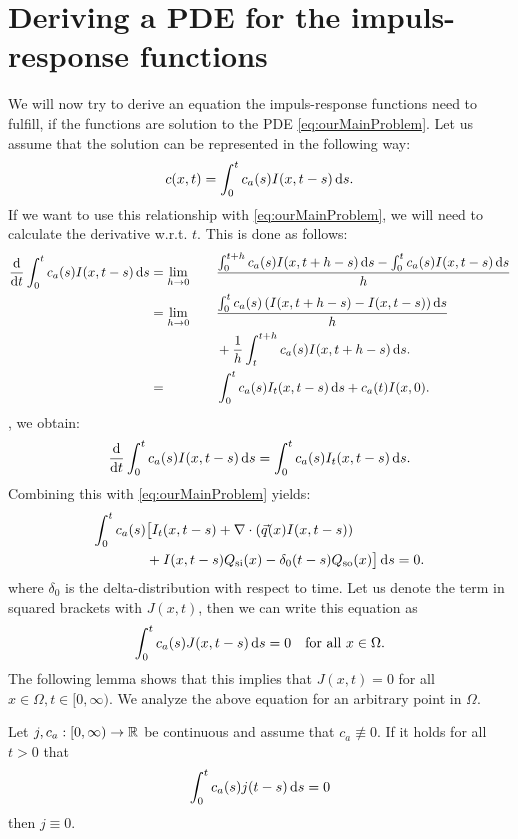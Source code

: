 \documentclass[paper=a4, fontsize=12pt,parskip=half,draft,headings=small]{scrartcl}
\newcommand{\Qso}{Q_{\mathrm{so}}}
\newcommand{\Qsi}{Q_{\mathrm{si}}}
\newcommand{\q}{\vec{q}}
\begin{document}
		\section{Deriving a PDE for the impuls-response functions}
		We will now try to derive an equation the impuls-response functions need to fulfill, if the functions are solution to the PDE \eqref{eq:ourMainProblem}.
		Let us assume that the solution can be represented in the following way:
		\[
			c(x,t) = \int_0^t c_a(s)I(x,t-s)\mathop{}\!\mathrm{d} s.
		\]
		If we want to use this relationship with \eqref{eq:ourMainProblem}, we will need to calculate the derivative w.r.t. $t$.
		This is done as follows:
		\begin{alignat*}{2}
			\frac{\diff}{\diff t} \int_0^t c_a(s)I(x,t-s)\diff s &= \lim_{h \to 0} \quad & &\frac{\int_0^{t+h} c_a(s)I(x,t+h-s)\diff s - \int_0^{t} c_a(s)I(x,t-s)\diff s}{h} \\
			&= \lim_{h \to 0} &&\frac{\int_0^{t} c_a(s)\left(I(x,t+h-s)-I(x,t-s) \right)\diff s}{h} \\
				&&&+ \frac{1}{h}\int_t^{t+h} c_a(s)I(x,t+h-s)\diff s. \\
				&= &&\int_0^t c_a(s) I_t(x,t-s) \diff s + c_a(t)I(x,0).
		\end{alignat*}
		, we obtain:
		\[
			\frac{\mathop{}\!\mathrm{d}}{\mathop{}\!\mathrm{d} t} \int_0^t c_a(s)I(x,t-s)\mathop{}\!\mathrm{d} s = \int_0^t c_a(s)I_t(x,t-s)\mathop{}\!\mathrm{d} s.
		\]
		Combining this with \eqref{eq:ourMainProblem} yields:
		\begin{align*}
			\int_0^t c_a(s) &\big[ I_t(x,t-s) + \nabla \cdot \left(\q(x)  I(x,t-s) \right) \\ 
			&+ I(x,t-s)\Qsi(x) -  \delta_0(t-s)\Qso(x) \big]  \diff s = 0.
		\end{align*}
		where $\delta_0$ is the delta-distribution with respect to time.
		Let us denote the term in squared brackets with $J(x,t)$, then we can write this equation as
		\[
			\int_0^t c_a(s) J(x,t-s) \mathop{}\!\mathrm{d} s = 0 \quad \text{for all }x \in \Omega.
		\]
		The following lemma shows that this implies that $J(x,t) = 0$ for all $x \in \Omega, t \in [0,\infty)$.
		We analyze the above equation for an arbitrary point in $\Omega$.
		\begin{lemma}
			Let $j,c_a:[0,\infty) \to \mathbb{R}$ be continuous and assume that $c_a \not\equiv 0$. If it holds for all $t>0$ that
			\[
				\int_0^t c_a(s) j(t-s) \mathop{}\!\mathrm{d} s = 0
			\]
			then $j\equiv 0$.
		\end{lemma}
\end{document}
